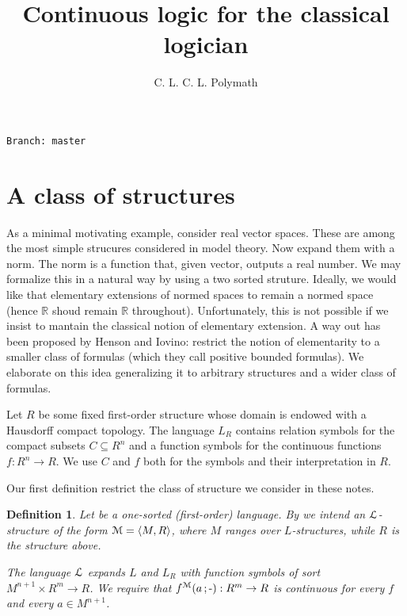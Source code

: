 \documentclass[11pt,oneside]{amsart}
\author{C. L. C. L. Polymath}
\theoremstyle{plain}
\newtheorem{definition}[theorem]{Definition}
\theoremstyle{remark}
\renewcommand*{\emph}[1]{%
   \smash{\tikz[baseline]\node[rectangle, fill=olive!25, rounded corners, inner xsep=0.5ex, inner ysep=0.2ex, anchor=base, minimum height = 2.7ex]{#1};}}
\begin{document}
\title{Continuous logic for the classical logician}
\hfill\texttt{Branch:\ master\ \DTMnow}\bigskip
\maketitle
\raggedbottom


\newcommand\dangersign[1][2ex]{%
  \renewcommand\stacktype{L}%
  \scaleto{\stackon[-.6pt]{\color{red}$\triangle$}{\color{red}\bfseries\small ?}}{#1}%
}


\section{A class of structures}\label{uno}


\def\ceq#1#2#3{\parbox[t]{23ex}{$\displaystyle #1$}\parbox{6ex}{\hfil $#2$}{$\displaystyle #3$}}

As a minimal motivating example, consider real vector spaces.
These are among the most simple strucures considered in model theory.
Now expand them with a norm.
The norm is a function that, given vector, outputs a real number.
We may formalize this in a natural way by using a two sorted struture.
Ideally, we would like that elementary extensions of normed spaces to remain a normed space (hence $\mathds{R}$ shoud remain $\mathds{R}$ throughout).
Unfortunately, this is not possible if we insist to mantain the classical notion of elementary extension.
A way out has been proposed by Henson and Iovino: restrict the notion of elementarity to a smaller class of formulas (which they call positive bounded formulas).
We elaborate on this idea generalizing it to arbitrary structures and a wider class of formulas.


Let $R$ be some fixed first-order structure whose domain is endowed with a Hausdorff compact topology.
The language $L_R$ contains relation symbols for the compact subsets $C\subseteq R^n$ and a function symbols for the continuous functions $f:R^n\to R$.
We use $C$ and $f$ both for the symbols and their interpretation in $R$.

Our first definition restrict the class of structure we consider in these notes.

\begin{definition}\label{def_0}
  Let \emph{$L$\/} be a one-sorted (first-order) language.
  By \emph{model\/} we intend an ${\EuScript L}$-structure of the form ${\EuScript M}=\langle  M,R\rangle$, where $M$ ranges over $L$-structures, while $R$ is the structure above.
  
  The language ${\EuScript L}$ expands $L$ and $L_R$ with function symbols of sort $M^{n+1}\times R^m\to R$.
  We require that $f^{\EuScript M}(a\,;\mbox{-}):R^m\to R$ is continuous for every $f$ and every $a\in M^{n+1}$. 
\end{definition}
\end{document}
